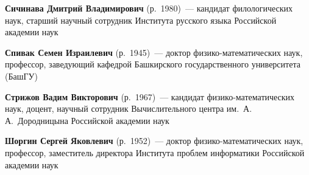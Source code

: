 \begin{multicols}{2}
\noindent
\textbf{Сичинава Дмитрий Владимирович} (р.\ 1980)~---
кандидат филологических наук, старший научный сотрудник Института русского языка
Российской академии наук

\vspace*{2pt}


\noindent
\textbf{Спивак Семен Израилевич} (р.\ 1945)~---
доктор фи\-зи\-ко-ма\-те\-ма\-ти\-че\-ских наук, профессор, заведующий кафедрой
Башкирского государственного университета (БашГУ)

\vspace*{2pt}

\noindent
\textbf{Стрижов Вадим Викторович} (р.\ 1967)~---
кандидат фи\-зи\-ко-ма\-те\-ма\-ти\-че\-ских наук, доцент, научный сотрудник
Вычислительного центра им.\ А.\,А.~Дородницына Российской академии наук


\vspace*{2pt}

\noindent
\textbf{Шоргин Сергей Яковлевич} (р.\ 1952)~---
доктор фи\-зи\-ко-ма\-те\-ма\-ти\-че\-ских наук, профессор, заместитель директора
Института проб\-лем информатики Российской академии наук




 \label{end\stat}










\end{multicols}

\newpage